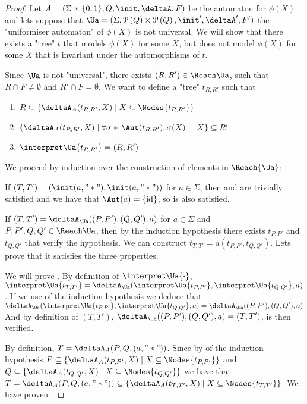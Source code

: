 \documentclass[a4paper,UKenglish,cleveref, autoref, thm-restate]{lipics-v2021}
\begin{document}
\begin{proof}
	Let $A =  (\Sigma \times \{0,1\}, Q, \init, \deltaA, F)$ be the automaton for $\phi(X)$ and lets suppose that
	$\Ua = (\Sigma, \parts Q \times \parts Q,\init', \deltaA', F')$ the "uniformiser automaton" of $\phi(X)$ is not universal.
	We will show that there exists a "tree" $t$ that models  $\phi(X)$ for some $X$, but does not model $\phi(X)$ for
	some $X$ that is invariant under the automorphisms of $t$.

	Since $\Ua$ is not "universal", there exists $(R,R') \in \Reach \Ua$, such that $R \cap F \neq \emptyset$ and $R' \cap F = \emptyset$.
	We want to define a "tree" $t_{R,R'}$ such that
	\begin{enumerate}
		\item $R \subseteq \{ \deltaA_A (t_{R,R'},X) \mid X \subseteq \Nodes {t_{R,R'}}\}$ \label{lem:prop1}
		\item $\{ \deltaA_A (t_{R,R'},X) \mid \forall \sigma \in \Aut(t_{R,R'}), \sigma(X) = X\} \subseteq R'$\label{lem:prop2}
		\item $\interpret \Ua {t_{R,R'}} = (R,R')$\label{lem:prop3}
	\end{enumerate}

	We proceed by induction over the construction of elements in $\Reach {\Ua}$:

	If $(T,T') = (\init(a,"*"), \init (a, "*"))$ for $a \in \Sigma$, then  and  are trivially satisfied and we have that
	$\Aut (a) = \{\text{id}\}$, so  is also satisfied.

	If $(T,T') = \deltaA_{\Ua}((P,P'),(Q,Q'),a)$ for $a \in \Sigma$ and $P,P',Q,Q' \in \Reach \Ua$, then by the induction hypothesis there exists
	$t_{P,P'}$ and $t_{Q,Q'}$ that verify the hypothesis. We can construct $t_{T,T'} = a(t_{P,P'},t_{Q,Q'})$. Lets prove that it satisfies the
	three properties.

	We will prove .
	By definition of $\interpret \Ua {\cdot}$,
	$\interpret \Ua {t_{T,T'}} = \deltaA_{\Ua} (\interpret \Ua {t_{P,P'}}, \interpret \Ua {t_{Q,Q'}}, a)$.
	If we use  of the induction hypothesis we deduce that
	$\deltaA_{\Ua} (\interpret \Ua {t_{P,P'}}, \interpret \Ua {t_{Q,Q'}}, a) = \deltaA_{\Ua} ((P,P'), (Q,Q'), a)$
	And by definition of $(T,T')$, $\deltaA_{\Ua} ((P,P'), (Q,Q'), a) = (T,T')$.
	 is then verified.

	By definition, $T = \deltaA_A(P,Q,(a,"*"))$. Since by  of the induction hypothesis $P \subseteq \{ \deltaA_A (t_{P,P'},X) \mid X \subseteq \Nodes {t_{P,P'}}\}$
	and $Q \subseteq \{ \deltaA_A (t_{Q,Q'},X) \mid X \subseteq \Nodes {t_{Q,Q'}}\}$  we have that
	$T = \deltaA_A(P,Q,(a,"*")) \subseteq \{ \deltaA_A (t_{T,T'},X) \mid X \subseteq \Nodes {t_{T,T'}}\}$. We have proven .


\end{proof}
\end{document}
